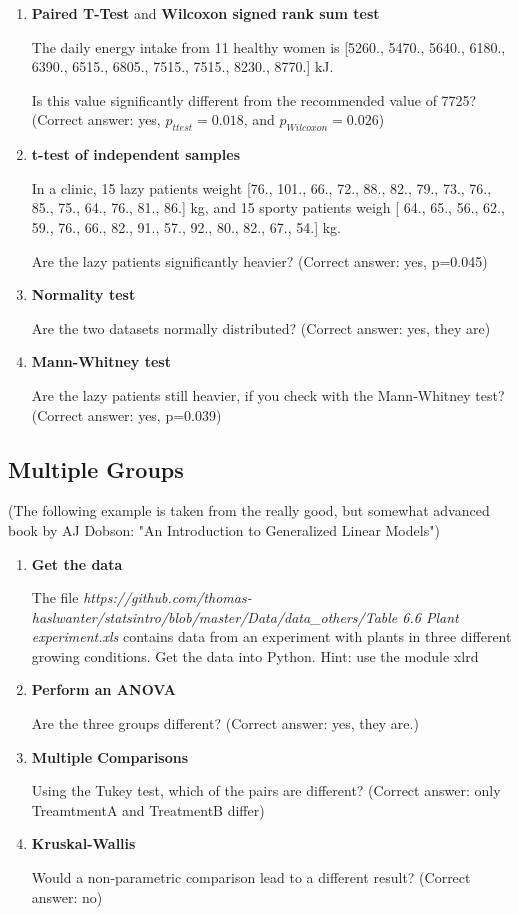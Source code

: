\begin{enumerate}
  \item \textbf{Paired T-Test} and \textbf{Wilcoxon signed rank sum test}

The daily energy intake from 11 healthy women is [5260., 5470., 5640., 6180., 6390., 6515., 6805., 7515., 7515., 8230., 8770.] kJ. 

    Is this value significantly different from the recommended value of 7725?
    (Correct answer: yes, $p_{ttest}=0.018$, and $p_{Wilcoxon}=0.026$)

  \item \textbf{t-test of independent samples}

In a clinic, 15 lazy patients weight [76., 101., 66., 72., 88., 82., 79., 73., 76., 85., 75., 64., 76., 81., 86.] kg, and 15 sporty patients weigh [ 64., 65., 56., 62., 59., 76., 66., 82., 91., 57., 92., 80., 82., 67., 54.] kg.

    Are the lazy patients significantly heavier?
    (Correct answer: yes, p=0.045)

  \item \textbf{Normality test}

    Are the two datasets normally distributed?
    (Correct answer: yes, they are)

  \item \textbf{Mann-Whitney test}

    Are the lazy patients still heavier, if you check with the Mann-Whitney test?
    (Correct answer: yes, p=0.039)
\end{enumerate}

\subsection{Multiple Groups}

(The following example is taken from the really good, but somewhat advanced book by AJ Dobson: "An Introduction to Generalized Linear Models")

\begin{enumerate}
  \item \textbf{Get the data}

    The file   \emph{https://github.com/thomas-haslwanter/statsintro/blob/master/Data/data\_others/Table 6.6 Plant experiment.xls} contains data from an experiment with plants in three different growing conditions. Get the data into Python.
    Hint: use the module xlrd

  \item \textbf{Perform an ANOVA}

    Are the three groups different?
    (Correct answer: yes, they are.)

  \item \textbf{Multiple Comparisons}

    Using the Tukey test, which of the pairs are different?
    (Correct answer: only TreamtmentA and TreatmentB differ)

  \item \textbf{Kruskal-Wallis}

    Would a non-parametric comparison lead to a different result?
    (Correct answer: no)

\end{enumerate}
